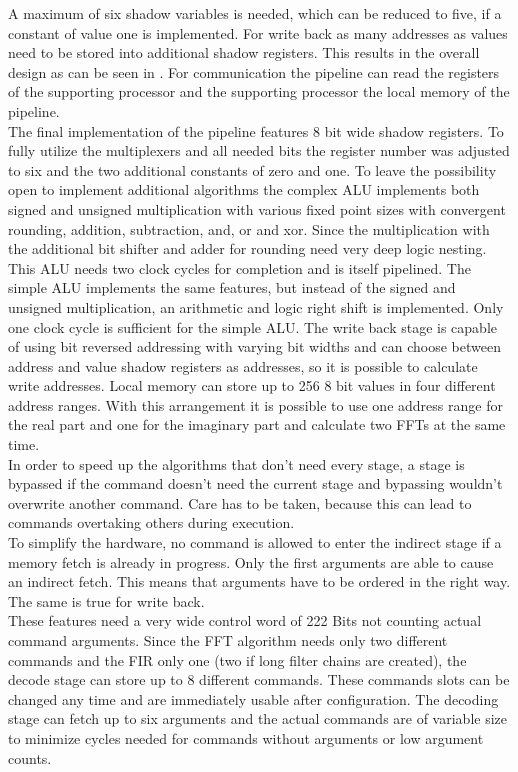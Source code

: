 \documentclass[11pt,twocolumn,technote,a4paper]{IEEEtran}
\begin{document}
A maximum of six shadow variables is needed, which can be reduced to five, if
a constant of value one is implemented. For write back as many addresses as
values need to be stored into additional shadow registers. This results in the
overall design as can be seen in . For communication the
pipeline can read the registers of the supporting processor and the supporting
processor the local memory of the pipeline.\\
The final implementation of the pipeline features 8 bit wide shadow registers.
To fully utilize the multiplexers and all needed bits the register number was
adjusted to six and the two additional constants of zero and one. To leave
the possibility open to implement additional algorithms the complex ALU
implements both signed and unsigned multiplication with various fixed point
sizes with convergent rounding, addition, subtraction, and, or and xor. Since
the multiplication with the additional bit shifter and adder for rounding need
very deep logic nesting. This ALU needs two clock cycles for completion and is
itself pipelined. The simple ALU implements the same features, but instead of
the signed and unsigned multiplication, an arithmetic and logic right shift is
implemented. Only one clock cycle is sufficient for the simple ALU. The write
back stage is capable of using bit reversed addressing with varying bit widths
and can choose between address and value shadow registers as addresses, so it
is possible to calculate write addresses. Local memory can store up to 256
8 bit values in four different address ranges. With this arrangement it is
possible to use one address range for the real part and one for the imaginary
part and calculate two FFTs at the same time.\\
In order to speed up the algorithms that don't need every stage, a stage is
bypassed if the command doesn't need the current stage and bypassing wouldn't
overwrite another command. Care has to be taken, because this can lead to
commands overtaking others during execution.\\
To simplify the hardware, no command is allowed to enter the indirect stage
if a memory fetch is already in progress. Only the first arguments are able
to cause an indirect fetch. This means that arguments have to be ordered in
the right way. The same is true for write back.\\
These features need a very wide control word of 222 Bits not counting actual
command arguments. Since the FFT algorithm needs only two different commands
and the FIR only one (two if long filter chains are created), the decode
stage can store up to 8 different commands. These commands slots can be changed
any time and are immediately usable after configuration. The decoding stage
can fetch up to six arguments and the actual commands are of variable size
to minimize cycles needed for commands without arguments or low argument counts.
\end{document}

